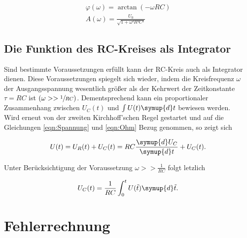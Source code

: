 \begin{gather}
\label{eqn:Phase_Amplitude}
    \varphi(\omega) = \arctan(-\omega RC)\\
    A(\omega) = \frac{U_0}{\sqrt{1 + \omega²R²C²}}
\end{gather}

\subsection{Die Funktion des RC-Kreises als Integrator}

Sind bestimmte Voraussetzungen erfüllt kann der RC-Kreis auch als Integrator dienen. Diese Voraussetzungen spiegelt sich wieder,
indem die Kreisfrequenz $\omega$ der Ausgangsspannung wesentlich größer als der Kehrwert der Zeitkonstante $\tau = RC$ ist $(\omega >> \sfrac{1}{RC})$.
Dementsprechend kann ein proportionaler Zusammenhang zwischen $U_C(t)$ und $\int U(t)\symup{d}t$ bewiesen werden.\\
Wird erneut von der zweiten Kirchhoff'schen Regel gestartet und auf die Gleichungen \eqref{eqn:Spannung} und \eqref{eqn:Ohm} Bezug genommen, so zeigt sich

\begin{equation}
    U(t) = U_R(t) + U_C(t) = RC\frac{\symup{d}U_C}{\symup{d}t} + U_C(t).
\end{equation}

\noindent Unter Berücksichtigung der Voraussetzung $\omega >> \frac{1}{RC}$ folgt letzlich

\begin{equation}
    U_C(t) = \frac{1}{RC}\int_0^t U(\tilde{t})\symup{d}\tilde{t}.
\end{equation}


\section{Fehlerrechnung}
